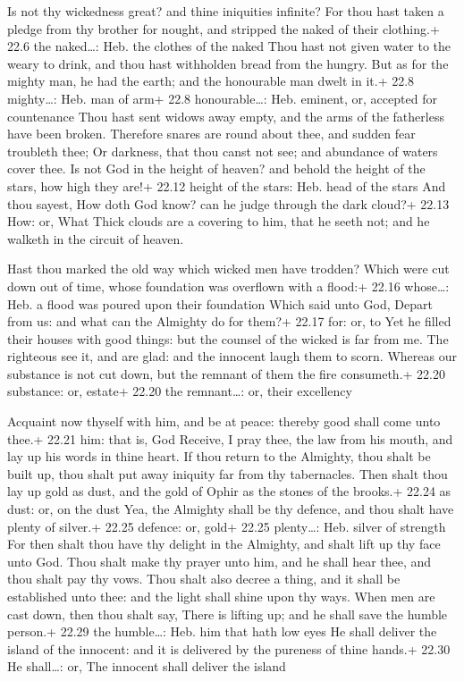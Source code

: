  Is not thy wickedness great? and thine iniquities infinite?
 For thou hast taken a pledge from thy brother for nought,
and stripped the naked of their clothing.+ 22.6 the naked\ldots: Heb.
the clothes of the naked  Thou hast not given water to the
weary to drink, and thou hast withholden bread from the hungry.
 But as for the mighty man, he had the earth; and the
honourable man dwelt in it.+ 22.8 mighty\ldots: Heb. man of arm+ 22.8
honourable\ldots: Heb. eminent, or, accepted for countenance
 Thou hast sent widows away empty, and the arms of the
fatherless have been broken.  Therefore snares are round
about thee, and sudden fear troubleth thee;  Or darkness,
that thou canst not see; and abundance of waters cover thee.
 Is not God in the height of heaven? and behold the height
of the stars, how high they are!+ 22.12 height of the stars: Heb. head
of the stars  And thou sayest, How doth God know? can he
judge through the dark cloud?+ 22.13 How: or, What  Thick
clouds are a covering to him, that he seeth not; and he walketh in the
circuit of heaven.

 Hast thou marked the old way which wicked men have
trodden?  Which were cut down out of time, whose foundation
was overflown with a flood:+ 22.16 whose\ldots: Heb. a flood was poured
upon their foundation  Which said unto God, Depart from us:
and what can the Almighty do for them?+ 22.17 for: or, to 
Yet he filled their houses with good things: but the counsel of the
wicked is far from me.  The righteous see it, and are glad:
and the innocent laugh them to scorn.  Whereas our
substance is not cut down, but the remnant of them the fire consumeth.+
22.20 substance: or, estate+ 22.20 the remnant\ldots: or, their
excellency

 Acquaint now thyself with him, and be at peace: thereby
good shall come unto thee.+ 22.21 him: that is, God 
Receive, I pray thee, the law from his mouth, and lay up his words in
thine heart.  If thou return to the Almighty, thou shalt be
built up, thou shalt put away iniquity far from thy tabernacles.
 Then shalt thou lay up gold as dust, and the gold of Ophir
as the stones of the brooks.+ 22.24 as dust: or, on the dust
 Yea, the Almighty shall be thy defence, and thou shalt
have plenty of silver.+ 22.25 defence: or, gold+ 22.25 plenty\ldots:
Heb. silver of strength  For then shalt thou have thy
delight in the Almighty, and shalt lift up thy face unto God.
 Thou shalt make thy prayer unto him, and he shall hear
thee, and thou shalt pay thy vows.  Thou shalt also decree
a thing, and it shall be established unto thee: and the light shall
shine upon thy ways.  When men are cast down, then thou
shalt say, There is lifting up; and he shall save the humble person.+
22.29 the humble\ldots: Heb. him that hath low eyes  He
shall deliver the island of the innocent: and it is delivered by the
pureness of thine hands.+ 22.30 He shall\ldots: or, The innocent shall
deliver the island

